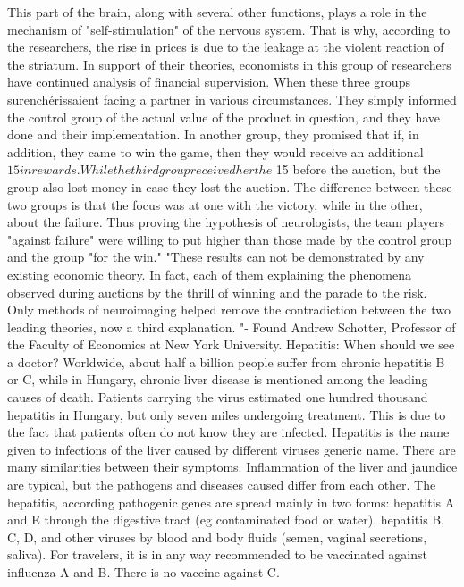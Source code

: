 This part of the brain, along with several other functions, plays a role in the mechanism of "self-stimulation" of the nervous system.
That is why, according to the researchers, the rise in prices is due to the leakage at the violent reaction of the striatum.
In support of their theories, economists in this group of researchers have continued analysis of financial supervision.
When these three groups surenchérissaient facing a partner in various circumstances.
They simply informed the control group of the actual value of the product in question, and they have done and their implementation.
In another group, they promised that if, in addition, they came to win the game, then they would receive an additional $ 15 in rewards.
While the third group received her the $ 15 before the auction, but the group also lost money in case they lost the auction.
The difference between these two groups is that the focus was at one with the victory, while in the other, about the failure.
Thus proving the hypothesis of neurologists, the team players "against failure" were willing to put higher than those made by the control group and the group "for the win."
"These results can not be demonstrated by any existing economic theory.
In fact, each of them explaining the phenomena observed during auctions by the thrill of winning and the parade to the risk.
Only methods of neuroimaging helped remove the contradiction between the two leading theories, now a third explanation. "- Found Andrew Schotter, Professor of the Faculty of Economics at New York University.
Hepatitis: When should we see a doctor?
Worldwide, about half a billion people suffer from chronic hepatitis B or C, while in Hungary, chronic liver disease is mentioned among the leading causes of death.
Patients carrying the virus estimated one hundred thousand hepatitis in Hungary, but only seven miles undergoing treatment. This is due to the fact that patients often do not know they are infected.
Hepatitis is the name given to infections of the liver caused by different viruses generic name.
There are many similarities between their symptoms. Inflammation of the liver and jaundice are typical, but the pathogens and diseases caused differ from each other.
The hepatitis, according pathogenic genes are spread mainly in two forms: hepatitis A and E through the digestive tract (eg contaminated food or water), hepatitis B, C, D, and other viruses by blood and body fluids (semen, vaginal secretions, saliva).
For travelers, it is in any way recommended to be vaccinated against influenza A and B. There is no vaccine against C.
